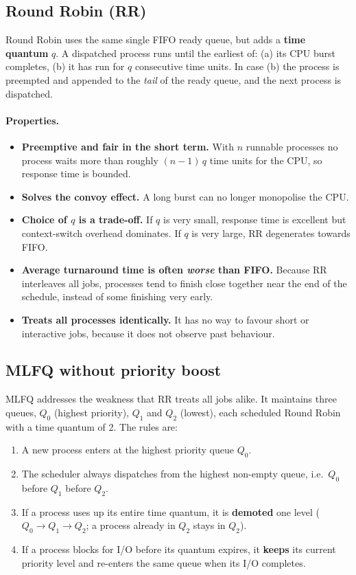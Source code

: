 \documentclass[11pt,a4paper]{article}
\begin{document}
\subsection{Round Robin (RR)}

Round Robin uses the same single FIFO ready queue, but adds a \textbf{time quantum} $q$.
A dispatched process runs until the earliest of: (a) its CPU burst completes, (b) it has
run for $q$ consecutive time units. In case (b) the process is preempted and appended to
the \emph{tail} of the ready queue, and the next process is dispatched.

\paragraph{Properties.}
\begin{itemize}\itemsep1pt
  \item \textbf{Preemptive and fair in the short term.} With $n$ runnable processes no
        process waits more than roughly $(n-1)\,q$ time units for the CPU, so response time
        is bounded.
  \item \textbf{Solves the convoy effect.} A long burst can no longer monopolise the CPU.
  \item \textbf{Choice of $q$ is a trade-off.} If $q$ is very small, response time is
        excellent but context-switch overhead dominates. If $q$ is very large, RR
        degenerates towards FIFO.
  \item \textbf{Average turnaround time is often \emph{worse} than FIFO.} Because RR
        interleaves all jobs, processes tend to finish close together near the end of the
        schedule, instead of some finishing very early.
  \item \textbf{Treats all processes identically.} It has no way to favour short or
        interactive jobs, because it does not observe past behaviour.
\end{itemize}

\subsection{MLFQ without priority boost}

MLFQ addresses the weakness that RR treats all jobs alike. It maintains three queues,
$Q_0$ (highest priority), $Q_1$ and $Q_2$ (lowest), each scheduled Round Robin with a time
quantum of 2. The rules are:

\begin{enumerate}\itemsep1pt
  \item A new process enters at the highest priority queue $Q_0$.
  \item The scheduler always dispatches from the highest non-empty queue, i.e.\ $Q_0$
        before $Q_1$ before $Q_2$.
  \item If a process uses up its entire time quantum, it is \textbf{demoted} one level
        ($Q_0\rightarrow Q_1 \rightarrow Q_2$; a process already in $Q_2$ stays in $Q_2$).
  \item If a process blocks for I/O before its quantum expires, it \textbf{keeps} its
        current priority level and re-enters the same queue when its I/O completes.
\end{enumerate}
\end{document}

